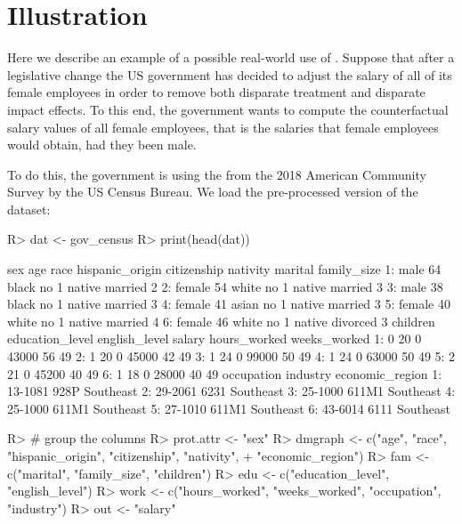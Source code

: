 \documentclass[
  notitle]{jss}
\begin{document}
\hypertarget{illustration}{%
\section{Illustration}\label{illustration}}

\label{Illustration} Here we describe an example of a possible
real-world use of . Suppose that after a legislative
change the US government has decided to adjust the salary of all of its
female employees in order to remove both disparate treatment and
disparate impact effects. To this end, the government wants to compute
the counterfactual salary values of all female employees, that is the
salaries that female employees would obtain, had they been male.

To do this, the government is using the from the 2018 American Community
Survey by the US Census Bureau. We load the pre-processed version of the
dataset:

\begin{CodeChunk}
\begin{CodeInput}
R> dat <- gov_census
R> print(head(dat))
\end{CodeInput}
\begin{CodeOutput}
      sex age  race hispanic_origin citizenship nativity  marital family_size
1:   male  64 black              no           1   native  married           2
2: female  54 white              no           1   native  married           3
3:   male  38 black              no           1   native  married           3
4: female  41 asian              no           1   native  married           3
5: female  40 white              no           1   native  married           4
6: female  46 white              no           1   native divorced           3
   children education_level english_level salary hours_worked weeks_worked
1:        0              20             0  43000           56           49
2:        1              20             0  45000           42           49
3:        1              24             0  99000           50           49
4:        1              24             0  63000           50           49
5:        2              21             0  45200           40           49
6:        1              18             0  28000           40           49
   occupation industry economic_region
1:    13-1081     928P       Southeast
2:    29-2061     6231       Southeast
3:    25-1000    611M1       Southeast
4:    25-1000    611M1       Southeast
5:    27-1010    611M1       Southeast
6:    43-6014     6111       Southeast
\end{CodeOutput}
\begin{CodeInput}
R> # group the columns
R> prot.attr <- "sex"
R> dmgraph <- c("age", "race", "hispanic_origin", "citizenship", "nativity",
+   "economic_region")
R> fam <- c("marital", "family_size", "children")
R> edu <- c("education_level", "english_level")
R> work <- c("hours_worked", "weeks_worked", "occupation", "industry")
R> out <- "salary"
\end{CodeInput}
\end{CodeChunk}
\end{document}
